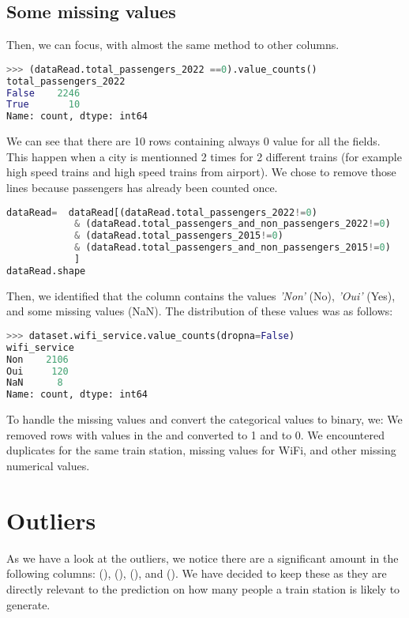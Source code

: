 \subsection{Some missing values}
Then, we can focus, with almost the same method to other columns.
\begin{lstlisting}[language=python]
>>> (dataRead.total_passengers_2022	==0).value_counts()
total_passengers_2022
False    2246
True       10
Name: count, dtype: int64
\end{lstlisting}
We can see that there are 10 rows containing always 0 value for all the fields. This happen when a city is mentionned 2 times for 2 different trains (for example high speed trains and high speed trains from airport). We chose to remove those lines because passengers has already been counted once.
\begin{lstlisting}[language=python]
dataRead=  dataRead[(dataRead.total_passengers_2022!=0)
            & (dataRead.total_passengers_and_non_passengers_2022!=0) 
            & (dataRead.total_passengers_2015!=0)
            & (dataRead.total_passengers_and_non_passengers_2015!=0)
            ]
dataRead.shape
\end{lstlisting}
Then, we identified that the  column contains the values \textit{'Non'} (No), \textit{'Oui'} (Yes), and some missing values (NaN). The distribution of these values was as follows:
\begin{lstlisting}[language=python]
>>> dataset.wifi_service.value_counts(dropna=False)
wifi_service
Non    2106
Oui     120
NaN      8
Name: count, dtype: int64
\end{lstlisting}
To handle the missing values and convert the categorical values to binary, we: We removed rows with  values in the  and converted  to 1 and  to 0. We encountered duplicates for the same train station, missing values for WiFi, and other missing numerical values.

\section{Outliers}
As we have a look at the outliers, we notice there are a significant amount in the following columns: (), (), (), and (). We have decided to keep these as they are directly relevant to the prediction on how many people a train station is likely to generate. 

